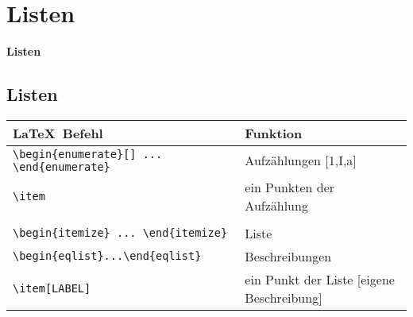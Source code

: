 \section{Listen}
\begin{frame}[c]
	\begin{center}
		\LARGE \textbf{Listen}
	\end{center}
\end{frame}
\subsection*{Listen}
\begin{frame}[fragile]
	\begin{center}
		\begin{tabular}{ll}
			\toprule
			\LaTeX\ Befehl										&	Funktion									\\ \midrule
			\lstinline|\begin{enumerate}[] ... \end{enumerate}|			&	Aufzählungen [1,I,a]								\\
			\lstinline|\item|							&	ein Punkten der Aufzählung	\\ \\
			\lstinline|\begin{itemize} ... \end{itemize}|		&	Liste				\\ 
			\lstinline|\begin{eqlist}...\end{eqlist}|	&	 Beschreibungen				\\
			\lstinline|\item[LABEL]|							&	ein Punkt der Liste [eigene Beschreibung]	\\
			\bottomrule
		\end{tabular}
	\end{center}

\end{frame}
